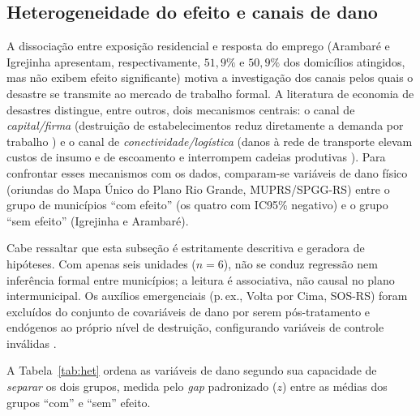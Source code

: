 \documentclass[a4paper,12pt]{article}
\begin{document}
\subsection{Heterogeneidade do efeito e canais de dano}
\label{sub:heterogeneidade}

A dissociação entre exposição residencial e resposta do emprego (Arambaré
e Igrejinha apresentam, respectivamente, $51{,}9\%$ e $50{,}9\%$ dos
domicílios atingidos, mas não exibem efeito significante) motiva a
investigação dos canais pelos quais o desastre se transmite ao mercado de
trabalho formal. A literatura de economia de desastres distingue, entre
outros, dois mecanismos centrais: o canal de \emph{capital/firma}
(destruição de estabelecimentos reduz diretamente a demanda por trabalho
\cite{haddad2015economic}) e o canal de \emph{conectividade/logística}
(danos à rede de transporte elevam custos de insumo e de escoamento e interrompem
cadeias produtivas \cite{xiao2014}). Para confrontar esses mecanismos com os
dados, comparam-se variáveis de dano físico (oriundas do Mapa Único do Plano Rio
Grande, MUPRS/SPGG-RS) entre o grupo de municípios ``com efeito''
(os quatro com IC95\% negativo) e o grupo ``sem efeito'' (Igrejinha e
Arambaré).

Cabe ressaltar que esta subseção é estritamente descritiva e geradora de hipóteses.
Com apenas seis unidades ($n=6$), não se conduz regressão nem inferência formal entre
municípios; a leitura é associativa, não causal no plano intermunicipal. Os auxílios
emergenciais (p.\,ex., Volta por Cima, SOS-RS) foram excluídos do conjunto de
covariáveis de dano por serem pós-tratamento e endógenos ao próprio nível de
destruição, configurando variáveis de controle inválidas \cite{angrist2009}.

A Tabela~\ref{tab:het} ordena as variáveis de dano segundo sua capacidade de
\emph{separar} os dois grupos, medida pelo \textit{gap} padronizado ($z$) entre
as médias dos grupos ``com'' e ``sem'' efeito.
\end{document}
